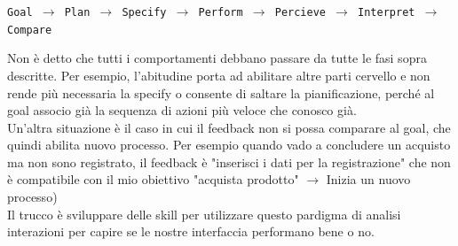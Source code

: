 \documentclass[10pt]{article}
\begin{document}
\begin{center}
\texttt{Goal $\rightarrow$  Plan $\rightarrow$ Specify $\rightarrow$ Perform $\rightarrow$ Percieve $\rightarrow$ Interpret $\rightarrow$ Compare}\\
\end{center}
Non è detto che tutti i comportamenti debbano passare da tutte le fasi sopra descritte. Per esempio, l'abitudine porta ad abilitare altre parti cervello e non rende più necessaria la specify o consente di saltare la pianificazione, perché al goal associo già la sequenza di azioni più veloce che conosco già.\\
Un'altra situazione è il caso in cui il feedback non si possa comparare al goal, che quindi abilita nuovo processo. Per esempio quando vado a concludere un acquisto ma non sono registrato, il feedback è "inserisci i dati per la registrazione" che non è compatibile con il mio obiettivo "acquista prodotto" $\rightarrow$ Inizia un nuovo processo)\\
Il trucco è sviluppare delle skill per utilizzare questo pardigma di analisi interazioni per capire se le nostre interfaccia performano bene o no.
\pagebreak
\end{document}
